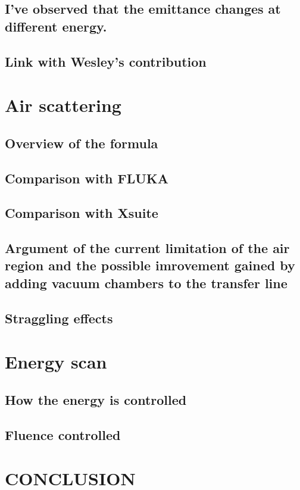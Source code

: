 \documentclass[a4paper,
               ]{jacow}
\begin{document}
\subsection{I've observed that the emittance changes at different energy.}
\subsection{Link with Wesley's contribution}

\section{Air scattering}
\subsection{Overview of the formula}
\subsection{Comparison with FLUKA}
\subsection{Comparison with Xsuite}
\subsection{Argument of the current limitation of the air region and the possible imrovement gained by adding vacuum chambers to the transfer line}
\subsection{Straggling effects}

\section{Energy scan}
\subsection{How the energy is controlled}
\subsection{Fluence controlled}


\section{CONCLUSION}
\end{document}
